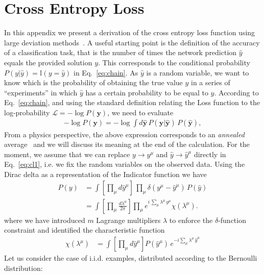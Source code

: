 \documentclass{article}
\begin{document}
\section{Cross Entropy Loss} \label{a:loss}
%
In this appendix we present a derivation of the cross entropy loss function using large deviation methods~\cite{mezard}. A useful starting point is the definition of the accuracy of a classification task, that is the number of times the network prediction $\hat{y}$ equals the provided solution $y$. This corresponds to the conditional probability $P(y|\hat{y}) =  \mathbb{I}(y = \hat{y})$ in Eq.~\eqref{eq:chain}.  As $\hat{y}$ is a random variable, we want to know which is the probability of obtaining the true value $y$ in a series of ``experiments'' in which $\hat{y}$  has a certain probability to be equal to $y$. According to Eq.~\eqref{eq:chain}, and using the standard definition  relating the Loss function to the log-probability $\mathscr{L} = - \log P(\mathbf{y})$, we need to evaluate
%
 \begin{align} \label{eq:cl1}
-\log P(\mathbf{y}) = - \log \int d \hat{\mathbf{y}}\, P(\mathbf{y} | \hat{\mathbf{y}}) \, P(\hat{\mathbf{y}}),
 \end{align}
%
From a physics perspective, the above expression corresponds to an {\it annealed } average~\cite{parisi2, giardina} and we will discuss its meaning at the end of the calculation. For the moment, we assume that we can replace $y \to y^{\mu}$ and $\hat{y} \to \hat{y}^{\mu}$ directly in Eq.~\eqref{eq:cl1}, i.e. we fix the random variables on the observed data. Using the Dirac delta  as a representation of the Indicator function we have
%
 \begin{align} \label{eq:cl1}
 P(y) & =  \int  \left[ \prod_{\mu} d \hat{y}^{\mu} \right]  \,  \prod_{\mu} \delta( y^{\mu} - \hat{y}^{\mu})  \, P(\hat{y})\\ \nonumber
 &=  \int  \left[ \prod_{\mu}  \frac{d\lambda^{\mu}}{2\pi} \right] \prod_{\mu}  e^{i \, \sum_{\mu} \lambda^{\mu} \, y^{\mu} } \chi(\lambda^{\mu}).
  \end{align}
%
where we have introduced $m$ Lagrange multipliers $\lambda$ to enforce the $\delta$-function constraint and identified  the characteristic function
%
\begin{align} \label{eq:char}
 \chi(\lambda^{\mu}) &=  \int  \left[ \prod_{\mu} d\hat{y}^{\mu} \right]  P(\hat{y}^{\mu} )  \, e^{-i \sum_{\mu} \lambda^{\mu} \, \hat{y}^{\mu}}
 \end{align}
%
Let us consider the case of i.i.d. examples, distributed according to the Bernoulli distribution:
\end{document}
